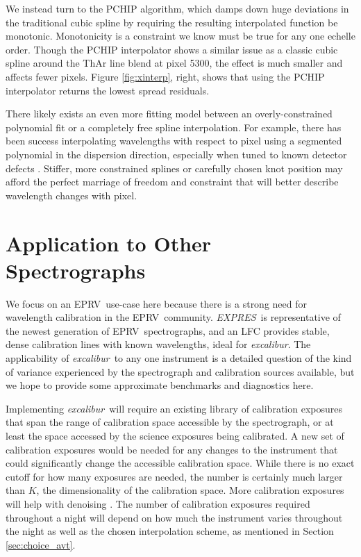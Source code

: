 \documentclass[twocolumn,table,xcolor,trackchanges]{aastex63}
\newcommand{\project}[1]{\textsl{#1}}
\newcommand{\name}{\project{excalibur}}
\newcommand{\acronym}[1]{{\small{#1}}}
\newcommand{\expres}{\project{\acronym{EXPRES}}}
\newcommand{\eprv}{\acronym{EPRV}}
\begin{document}
We instead turn to the PCHIP algorithm, which damps down huge deviations in the traditional cubic spline by requiring the resulting interpolated function be monotonic.  Monotonicity is a constraint we know must be true for any one echelle order.  Though the PCHIP interpolator shows a similar issue as a classic cubic spline around the ThAr line blend at pixel 5300, the effect is much smaller and affects fewer pixels.  Figure \ref{fig:xinterp}, right, shows that using the PCHIP interpolator returns the lowest spread residuals.  

There likely exists an even more fitting model between an overly-constrained polynomial fit or a completely free spline interpolation.  For example, there has been success interpolating wavelengths with respect to pixel using a segmented polynomial in the dispersion direction, especially when tuned to known detector defects \citep{milakovic2020}.  Stiffer, more constrained splines or carefully chosen knot position may afford the perfect marriage of freedom and constraint that will better describe wavelength changes with pixel.


\section{Application to Other Spectrographs}
\label{sec:others}
We focus on an \eprv\ use-case here because there is a strong need for wavelength calibration in the \eprv\ community.  \expres\ is representative of the newest generation of \eprv\ spectrographs, and an LFC provides stable, dense calibration lines with known wavelengths, ideal for \name.  The applicability of \name\ to any one instrument is a detailed question of the kind of variance experienced by the spectrograph and calibration sources available, but we hope to provide some approximate benchmarks and diagnostics here.

Implementing \name\ will require an existing library of calibration exposures that span the range of calibration space accessible by the spectrograph, or at least the space accessed by the science exposures being calibrated.  A new set of calibration exposures would be needed for any changes to the instrument that could significantly change the accessible calibration space.  While there is no exact cutoff for how many exposures are needed, the number is certainly much larger than $K$, the dimensionality of the calibration space.  More calibration exposures will help with denoising .  The number of calibration exposures required throughout a night will depend on how much the instrument varies throughout the night as well as the chosen interpolation scheme, as mentioned in Section \ref{sec:choice_avt}.
\end{document}
